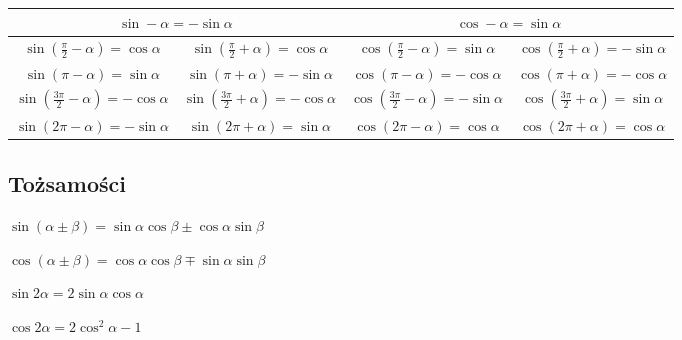 \documentclass[a5paper,8pt]{extarticle}
\begin{document}
\begin{center}
\begin{tabular}{ c | c | c | c }
	\multicolumn{2}{c|}{$ \sin -\alpha = -\sin \alpha $} &
	\multicolumn{2}{c}{$ \cos -\alpha = \sin \alpha $} \\ \hline

	$ \sin \left( \frac{\pi}{2} - \alpha \right) = \cos \alpha $ &
	$ \sin \left( \frac{\pi}{2} + \alpha \right) = \cos \alpha $ &
	$ \cos \left( \frac{\pi}{2} - \alpha \right) = \sin \alpha $ &
	$ \cos \left( \frac{\pi}{2} + \alpha \right) = -\sin \alpha $ \\

	$ \sin \left( \pi - \alpha \right) = \sin \alpha $ &
	$ \sin \left( \pi + \alpha \right) = -\sin \alpha $ &
	$ \cos \left( \pi - \alpha \right) = -\cos \alpha $ &
	$ \cos \left( \pi + \alpha \right) = -\cos \alpha $ \\
	
	\hline

	$ \sin \left( \frac{3\pi}{2} - \alpha \right) = -\cos \alpha $ &
	$ \sin \left( \frac{3\pi}{2} + \alpha \right) = -\cos \alpha $ &
	$ \cos \left( \frac{3\pi}{2} - \alpha \right) = -\sin \alpha $ &
	$ \cos \left( \frac{3\pi}{2} + \alpha \right) = \sin \alpha $ \\

	$ \sin \left( 2\pi - \alpha \right) = -\sin \alpha $ &
	$ \sin \left( 2\pi + \alpha \right) = \sin \alpha $ &
	$ \cos \left( 2\pi - \alpha \right) = \cos \alpha $ &
	$ \cos \left( 2\pi + \alpha \right) = \cos \alpha $
\end{tabular}
\end{center}

\subsection{Tożsamości}

\begin{multicols}{2}
\begin{description}
	\item $ \sin(\alpha \pm \beta) = \sin\alpha\cos\beta \pm \cos\alpha\sin\beta $
	\item $ \cos(\alpha \pm \beta) = \cos\alpha\cos\beta \mp \sin\alpha\sin\beta $
	\item $ \sin2\alpha = 2\sin\alpha\cos\alpha $
	\item $ \cos2\alpha = 2\cos^2\alpha - 1 $
\end{description}
\end{multicols}
\end{document}
